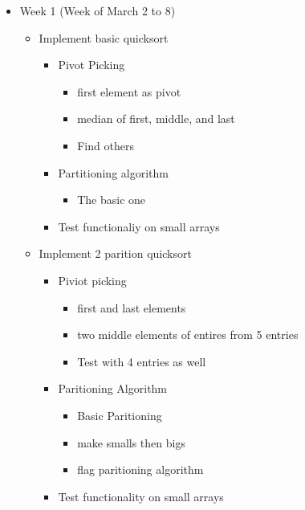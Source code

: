 \documentclass[12pt]{report}
\begin{document}
	\begin{itemize}
		\item Week 1 (Week of March 2 to 8)
		\begin{itemize}
			\item Implement basic quicksort
			\begin{itemize}
				\item Pivot Picking
				\begin{itemize}
					\item first element as pivot
					\item median of first, middle, and last
					\item Find others
				\end{itemize}
				
				\item Partitioning algorithm
				\begin{itemize}
					\item The basic one
				\end{itemize}
				\item Test functionaliy on small arrays
			\end{itemize}
			
			\item Implement 2 parition quicksort
			\begin{itemize}
				\item Piviot picking
				\begin{itemize}
					\item first and last elements
					\item two middle elements of entires from 5 entries
					\item Test with 4 entries as well
				\end{itemize}
				\item Paritioning Algorithm
				\begin{itemize}
					\item Basic Paritioning
					\item make smalls then bigs
					\item flag paritioning algorithm
				\end{itemize}
				\item Test functionality on small arrays
			\end{itemize}
		\end{itemize}
			

\end{itemize}
\end{document}
